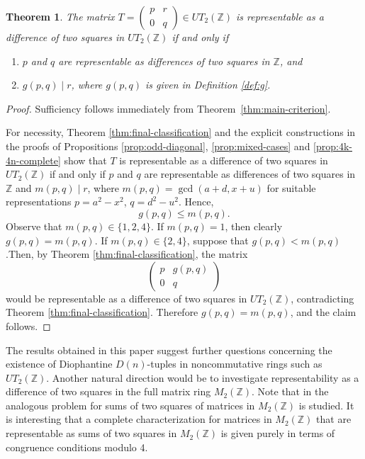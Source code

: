 \documentclass[11pt]{amsart}
\newtheorem{theorem}{Theorem}%
\def\Z{\mathbb{Z}}
\begin{document}
\begin{theorem}\label{thm:g-pq}
The matrix $T=\begin{pmatrix}p&r\\0&q\end{pmatrix}\in UT_2(\mathbb Z)$ 
is representable as a difference of two squares in $UT_2(\mathbb Z)$ if and only if
\begin{enumerate}
\item $p$ and $q$ are representable as differences of two squares in $\mathbb Z$, and
\item $g(p,q)\mid r$, where $g(p,q)$ is given in Definition \ref{def:g}.
\end{enumerate}
\end{theorem}
\begin{proof}
Sufficiency follows immediately from Theorem~\ref{thm:main-criterion}.

For necessity, Theorem \ref{thm:final-classification} and the explicit
constructions in the proofs of Propositions \ref{prop:odd-diagonal}, \ref{prop:mixed-cases} and \ref{prop:4k-4n-complete} show that $T$ is
representable as a difference of two squares in $UT_2(\Z)$ if and only if $p$
and $q$ are representable as differences of two squares in $\Z$ and $m(p, q)\mid r$,
where $m(p, q) = \gcd(a+d, x+u)$ for suitable representations $p = a^2-x^2$, $q = d^2-u^2$. Hence,
$$g(p,q)\le m(p,q).$$
Observe that $m(p,q)\in\{1,2,4\}$. If $m(p,q)=1$, then clearly $g(p,q)=m(p,q)$. If $m(p,q)\in\{2,4\}$, suppose that $g(p,q)<m(p,q)$.Then, by
Theorem  \ref{thm:final-classification}, the matrix
$$\begin{pmatrix}p&g(p,q)\\0&q\end{pmatrix}$$
would be representable as a difference of two squares in $UT_2(\Z)$, contradicting Theorem \ref{thm:final-classification}. Therefore $g(p,q) = m(p,q)$, and the claim follows.
\end{proof}

The results obtained in this paper suggest further questions concerning the existence of Diophantine $D(n)$-tuples in noncommutative rings such as $UT_2(\Z)$. Another natural direction would be to investigate representability as a difference of two squares in the full matrix ring $M_2(\Z)$. Note that in \cite{kan} the analogous problem for sums of two squares of matrices in $M_2(\Z)$ is studied. It is interesting that a complete characterization for matrices in $M_2(\Z)$ that are representable as sums of two squares in $M_2(\Z)$   is given purely in terms of congruence conditions modulo 4. 
\end{document}
